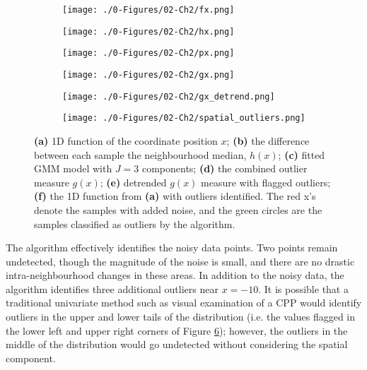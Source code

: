 \begin{figure}[!t]
    \begin{subfigure}{0.5\textwidth}
        \centering
        \texttt{[image: ./0-Figures/02-Ch2/fx.png]}
        \caption{}
        \label{fig:fx}
    \end{subfigure}
    \begin{subfigure}{0.5\textwidth}
        \centering
        \texttt{[image: ./0-Figures/02-Ch2/hx.png]}
        \caption{}
        \label{fig:hx}
    \end{subfigure}
    \begin{subfigure}{0.5\textwidth}
        \centering
        \texttt{[image: ./0-Figures/02-Ch2/px.png]}
        \caption{}
        \label{fig:px}
    \end{subfigure}
    \begin{subfigure}{0.5\textwidth}
        \centering
        \texttt{[image: ./0-Figures/02-Ch2/gx.png]}
        \caption{}
        \label{fig:gx}
    \end{subfigure}
    \begin{subfigure}{0.5\textwidth}
        \centering
        \texttt{[image: ./0-Figures/02-Ch2/gx\_detrend.png]}
        \caption{}
        \label{fig:gx_detrend}
    \end{subfigure}
    \begin{subfigure}{0.5\textwidth}
        \centering
        \texttt{[image: ./0-Figures/02-Ch2/spatial\_outliers.png]}
        \caption{}
        \label{fig:spatial_outliers}
    \end{subfigure}
    \caption{\textbf{(a)} \gls{1D} function of the coordinate position $x$; \textbf{(b)} the difference between each sample the neighbourhood median, $h(x)$; \textbf{(c)} fitted \gls{GMM} model with $J=3$ components; \textbf{(d)} the combined outlier measure $g(x)$; \textbf{(e)} detrended $g(x)$ measure with flagged outliers; \textbf{(f)} the \gls{1D} function from \textbf{(a)} with outliers identified. The red x's denote the samples with added noise, and the green circles are the samples classified as outliers by the algorithm.}
    \label{fig:outliers_1d}
\end{figure}

The algorithm effectively identifies the noisy data points. Two points remain undetected, though the magnitude of the noise is small, and there are no drastic intra-neighbourhood changes in these areas. In addition to the noisy data, the algorithm identifies three additional outliers near $x=-10$. It is possible that a traditional univariate method such as visual examination of a \gls{CPP} would identify outliers in the upper and lower tails of the distribution (i.e. the values flagged in the lower left and upper right corners of Figure \ref{fig:spatial_outliers}); however, the outliers in the middle of the distribution would go undetected without considering the spatial component.

